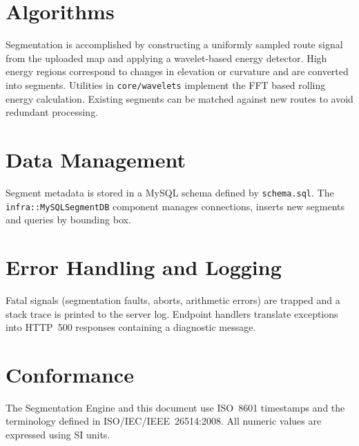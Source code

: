 \documentclass{article}
\begin{document}
\section{Algorithms}
Segmentation is accomplished by constructing a uniformly sampled route signal from the uploaded map and applying a wavelet-based energy detector. High energy regions correspond to changes in elevation or curvature and are converted into segments. Utilities in \texttt{core/wavelets} implement the FFT based rolling energy calculation. Existing segments can be matched against new routes to avoid redundant processing.

\section{Data Management}
Segment metadata is stored in a MySQL schema defined by \texttt{schema.sql}. The \texttt{infra::MySQLSegmentDB} component manages connections, inserts new segments and queries by bounding box.

\section{Error Handling and Logging}
Fatal signals (segmentation faults, aborts, arithmetic errors) are trapped and a stack trace is printed to the server log. Endpoint handlers translate exceptions into HTTP~500 responses containing a diagnostic message.

\section{Conformance}
The Segmentation Engine and this document use ISO~8601 timestamps and the terminology defined in ISO/IEC/IEEE~26514:2008. All numeric values are expressed using SI units.
\end{document}
